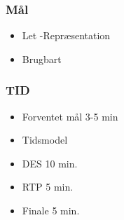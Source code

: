 \documentclass{beamer}
\begin{document}
\begin{frame}
  \frametitle{Mål}
  \begin{itemize}
	\item Let -Repræsentation
	\item Brugbart
  \end{itemize}
\end{frame}

\begin{frame}
  \frametitle{TID}
  \begin{itemize}
	\item Forventet mål 3-5 min
	\item Tidsmodel
	\item DES 10 min.
	\item RTP 5 min.
	\item Finale 5 min.
  \end{itemize}
\end{frame}
\end{document}
